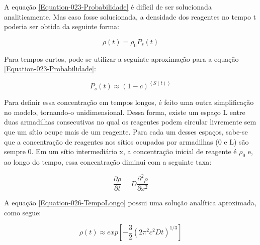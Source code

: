 A equação \ref{Equation-023-Probabilidade} é difícil de ser solucionada
analiticamente\cite{3}. Mas caso fosse solucionada, a densidade dos reagentes no
tempo t poderia ser obtida da seguinte forma:

{
\setlength{\belowdisplayskip}{0pt} \setlength{\belowdisplayshortskip}{0pt}
\setlength{\abovedisplayskip}{0pt} \setlength{\abovedisplayshortskip}{0pt}

\begin{equation}
  \rho(t) = \rho_0P_s(t)
  \label{Equation-024}
\end{equation}
}

Para tempos curtos, pode-se utilizar a seguinte aproximação para a equação
\ref{Equation-023-Probabilidade}:

{
\setlength{\belowdisplayskip}{0pt} \setlength{\belowdisplayshortskip}{0pt}
\setlength{\abovedisplayskip}{0pt} \setlength{\abovedisplayshortskip}{0pt}

\begin{equation}
  P_s(t) \approx (1-c)^{\left<S(t)\right>}
  \label{Equation-025}
\end{equation}
}

Para definir essa concentração em tempos longos, é feito uma outra simplificação
no modelo, tornando-o unidimensional. Dessa forma, existe um espaço L entre duas
armadilhas consecutivas no qual os reagentes podem circular livremente sem que
um sítio ocupe mais de um reagente. Para cada um desses espaços, sabe-se que a
concentração de reagentes nos sítios ocupados por armadilhas (0 e L) são sempre
0. Em um sítio intermediário x, a concentração inicial de reagente é $\rho_0$ e,
ao longo do tempo, essa concentração diminui com a seguinte taxa\cite{3}:

{
\setlength{\belowdisplayskip}{0pt} \setlength{\belowdisplayshortskip}{0pt}
\setlength{\abovedisplayskip}{0pt} \setlength{\abovedisplayshortskip}{0pt}

\begin{equation}
  \frac{\partial \rho}{\partial t} = D\frac{\partial^2 \rho}{\partial x^2}
  \label{Equation-026-TempoLongo}
\end{equation}
}

A equação \ref{Equation-026-TempoLongo} possui uma solução analítica aproximada,
como segue\cite{3}:

{
\setlength{\belowdisplayskip}{0pt} \setlength{\belowdisplayshortskip}{0pt}
\setlength{\abovedisplayskip}{0pt} \setlength{\abovedisplayshortskip}{0pt}

\begin{equation}
  \rho(t) \approx exp\left[ -\frac{3}{2} (2\pi^2c^2Dt)^{1/3} \right]
  \label{Equation-027-Decaimento}
\end{equation}
}
